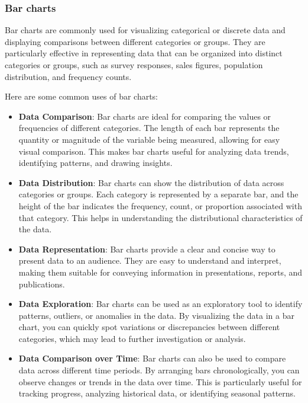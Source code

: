 \documentclass[10pt]{extarticle}
\newcommand{\<}{\langle}
\renewcommand{\>}{\rangle}
\theoremstyle{mystyle}{\newtheorem*{remark}{Remark}}
\theoremstyle{mystyle}{\newtheorem*{remarks}{Remarks}}
\theoremstyle{mystyle}{\newtheorem*{example}{Example}}
\theoremstyle{mystyle}{\newtheorem*{examples}{Examples}}
\theoremstyle{definition}{\newtheorem*{exercise}{Exercise}}
\theoremstyle{warn}
\begin{document}
\subsubsection{Bar charts}
Bar charts are commonly used for visualizing categorical or discrete data and displaying comparisons between different categories or groups. They are particularly effective in representing data that can be organized into distinct categories or groups, such as survey responses, sales figures, population distribution, and frequency counts.

Here are some common uses of bar charts:
\begin{itemize}
\item \textbf{Data Comparison}: Bar charts are ideal for comparing the values or frequencies of different categories. The length of each bar represents the quantity or magnitude of the variable being measured, allowing for easy visual comparison. This makes bar charts useful for analyzing data trends, identifying patterns, and drawing insights.

\item \textbf{Data Distribution}: Bar charts can show the distribution of data across categories or groups. Each category is represented by a separate bar, and the height of the bar indicates the frequency, count, or proportion associated with that category. This helps in understanding the distributional characteristics of the data.

\item \textbf{Data Representation}: Bar charts provide a clear and concise way to present data to an audience. They are easy to understand and interpret, making them suitable for conveying information in presentations, reports, and publications.

\item \textbf{Data Exploration}: Bar charts can be used as an exploratory tool to identify patterns, outliers, or anomalies in the data. By visualizing the data in a bar chart, you can quickly spot variations or discrepancies between different categories, which may lead to further investigation or analysis.

\item \textbf{Data Comparison over Time}: Bar charts can also be used to compare data across different time periods. By arranging bars chronologically, you can observe changes or trends in the data over time. This is particularly useful for tracking progress, analyzing historical data, or identifying seasonal patterns.
\end{itemize}
\end{document}
